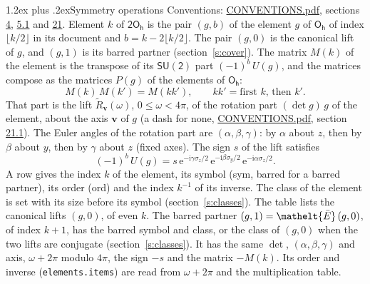 \documentclass[10pt,a4paper]{article}
\makeatletter
\renewcommand\section{\@startsection{section}{1}{\z@}{-3ex plus -1ex minus -.2ex}%
  {1.2ex plus .2ex}{\normalfont\large\sffamily\bfseries\color{parttitle}}}
\numberwithin{equation}{section}
\newcommand{\eltfont}[1]{{\let\sigma\eltsigma\mathelt{#1}}}
\newcommand{\grp}[1]{\mathsf{#1}}
\newcommand{\elt}[1]{\eltfont{#1}}
\newcommand{\vv}{\mathbf{v}}
\newcommand{\iunit}{\mathrm{i}}
\newcommand{\expe}{\mathrm{e}}
\newcommand{\barred}[1]{\bar{#1}}
\newcommand{\lift}[1]{\tilde{#1}}
\newcommand{\pauli}[1]{\sigma_{#1}}
\makeatother
\begin{document}
\section{Symmetry operations}\label{s:elements}
Conventions: \href{../../CONVENTIONS.pdf}{CONVENTIONS.pdf}, sections \href{../../../rotation/CONVENTIONS.pdf\#conv.4}{4}, \href{../../../rotation/CONVENTIONS.pdf\#conv.5.1}{5.1} and \href{../../CONVENTIONS.pdf\#conv.21}{21}.
\leavevmode\label{n:index.element}\label{n:element.g}Element $k$ of $\grp{2O_{h}}$ is the pair $(g, b)$ of the element $g$ of \href{../../../rotation/data/pdf/Oh.pdf}{$\grp{O_{h}}$} of index $\lfloor k/2\rfloor$ in its document and $b = k - 2\lfloor k/2\rfloor$. The pair $(g, 0)$ is the canonical lift of $g$, and $(g, 1)$ is its barred partner (section~\ref{s:cover}). \label{n:matrix.element.pin}\label{n:matrix.element}The matrix $M(k)$ of the element is the transpose of its $\grp{SU(2)}$ part $(-1)^{b}\,U(g)$, and the matrices compose as the matrices $P(g)$ of the elements of $\grp{O_{h}}$:
\begin{equation}\label{e:mprod}M(k)\,M(k') = M(kk'),\qquad kk' = \text{first } k\text{, then } k'.\end{equation}
\leavevmode\label{n:angle.omega}\label{n:vector.axis}\label{n:vector.pole}That part is the lift $\lift{R}_{\vv}(\omega)$, $0 \le \omega < 4\pi$, of the rotation part $(\det g)\,g$ of the element, about the axis $\vv$ of $g$ (a dash for none, \href{../../CONVENTIONS.pdf}{CONVENTIONS.pdf}, section \href{../../CONVENTIONS.pdf\#conv.21.1}{21.1}). \label{n:angle.euler.alpha}\label{n:angle.euler.beta}\label{n:angle.euler.gamma}\label{n:vector.coordinates}The Euler angles of the rotation part are $(\alpha,\beta,\gamma)$: by $\alpha$ about $z$, then by $\beta$ about $y$, then by $\gamma$ about $z$ (fixed axes). \label{n:local.euler.sign}The sign $s$ of the lift satisfies
\begin{equation}\label{e:euler}(-1)^{b}\,U(g) = s\,\expe^{-\iunit\gamma\pauli{z}/2}\,\expe^{-\iunit\beta\pauli{y}/2}\,\expe^{-\iunit\alpha\pauli{z}/2}.\end{equation}
\leavevmode\label{n:index.element.inverse}\label{n:head.sym}\label{n:head.ord}A row gives the index $k$ of the element, its symbol (sym, barred for a barred partner), its order (ord) and the index $k^{-1}$ of its inverse. \label{n:head.class}The class of the element is set with its size before its symbol (section~\ref{s:classes}).
The table lists the canonical lifts $(g, 0)$, of even $k$. The barred partner $(g, 1) = \elt{\barred{E}}\,(g, 0)$, of index $k + 1$, has the barred symbol and class, or the class of $(g, 0)$ when the two lifts are conjugate (section~\ref{s:classes}). It has the same $\det$, $(\alpha,\beta,\gamma)$ and axis, $\omega + 2\pi$ modulo $4\pi$, the sign $-s$ and the matrix $-M(k)$. Its order and inverse (\texttt{elements.items}) are read from $\omega + 2\pi$ and the multiplication table.
\end{document}
